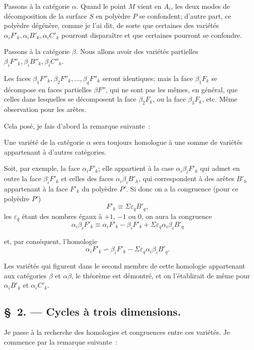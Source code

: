 \documentclass{article}
\begin{document}
Passons à la catégorie $\alpha$. Quand le point $M$ vient en $A_{i}$, les deux modes de décomposition de la surface $S$ en polyèdre $P$ se confondent; d'autre part, ce polyèdre dégénère, comme je l'ai dit, de sorte que certaines des variétés $\alpha_{i}F'_{k}, \alpha_{i}B'_{k}, \alpha_{i}C'_{k}$ pourront disparaître et que certaines pourront se confondre.

Passons à la catégorie $\beta$. Nous allons avoir des variétés partielles $\beta_{i}F''_{k}, \beta_{i}B''_{k}, \beta_{i}C''_{k}$.

Les faces $\beta_{1}F''_{k}, \beta_{2}F''_{k}, \ldots, \beta_{q}F''_{k}$ seront identiques; mais la face $\beta_{1}F_{k}$ se décompose en faces partielles $\beta F''$, qui ne sont pas les mêmes, en général, que celles dans lesquelles se décomposent la face $\beta_{2}F_{k}$, ou la face $\beta_{3}F_{k}$, etc. Même observation pour les arêtes.

Cela posé, je fais d'abord la remarque suivante~:

Une variété de la catégorie $\alpha$ sera toujours homologue à une somme de variétés appartenant à d'autres catégories.

Soit, par exemple, la face $\alpha_{i}F'_{k}$; elle appartient à la case $\alpha_{i}\beta_{i}F'_{k}$ qui admet en outre la face $\beta_{i}F'_{k}$ et celles des faces $\alpha_{i}\beta_{i}B'_{h}$, qui correspondent à des arêtes $B'_{h}$ appartenant à la face $F'_{k}$ du polyèdre $P'$. Si donc on a la congruence (pour ce polyèdre $P'$)
\[ F'_{k} \equiv \Sigma \varepsilon_{q} B'_{q}, \]
les $\varepsilon_{q}$ étant des nombres égaux à $+1$, $-1$ ou 0, on aura la congruence
\[ \alpha_{i}\beta_{i}F'_{k} \equiv \alpha_{i}F'_{k} - \beta_{i}F'_{k} + \Sigma \varepsilon_{q} \alpha_{i}\beta_{i}B'_{q} \]

et, par conséquent, l'homologie
\[ \alpha_{i}F'_{k} \backsim \beta_{i}F'_{k} - \Sigma \varepsilon_{q} \alpha_{i}\beta_{i}B'_{q}. \]

Les variétés qui figurent dans le second membre de cette homologie appartenant aux catégories $\beta$ et $\alpha\beta$, le théorème est démontré, et on l'établirait de même pour $\alpha_{i}B'_{k}$ et $\alpha_{i}C'_{k}$.

\subsection*{\S~2. --- Cycles à trois dimensions.}

Je passe à la recherche des homologies et congruences entre ces variétés. Je commence par la remarque suivante~:
\end{document}
